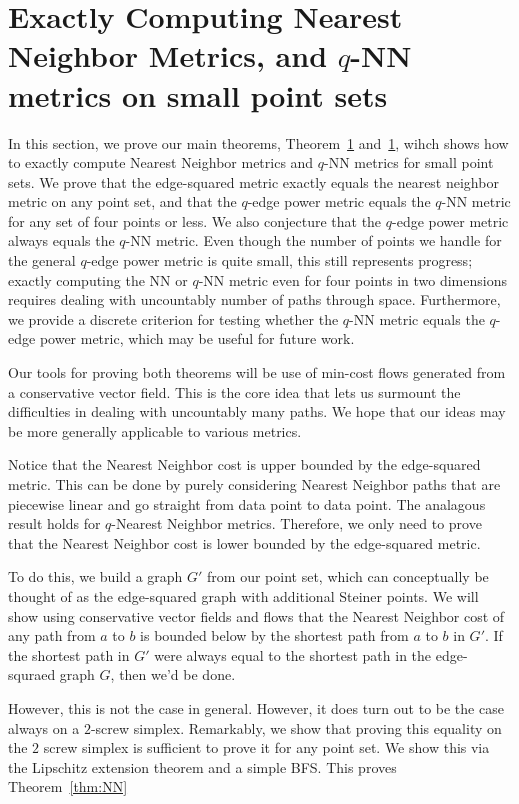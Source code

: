 \section{Exactly Computing Nearest Neighbor Metrics, and $q$-NN metrics on
small point sets}

In this section, we prove our main theorems, Theorem~\ref{} and~\ref{},
wihch shows how to exactly compute Nearest Neighbor metrics and $q$-NN
metrics for small point sets.
We prove that the edge-squared metric exactly equals the nearest neighbor
metric on any point set, and that the $q$-edge power metric equals the $q$-NN
metric for any set of four points or less. We also conjecture that the $q$-edge
power metric always equals the $q$-NN metric. Even though the number of points
we handle for the general $q$-edge power metric is quite small, this still
represents progress; exactly computing the NN or $q$-NN metric even for four
points in two dimensions requires dealing with uncountably number of paths
through space. Furthermore, we provide a discrete criterion for testing whether
the $q$-NN metric equals the $q$-edge power metric, which may be useful for
future work.

Our tools for proving both theorems will be use of min-cost flows generated
from a conservative vector field. This is the core idea that lets us surmount
the difficulties in dealing with uncountably many paths. We hope that our ideas
may be more generally applicable to various metrics.  

Notice that the Nearest Neighbor cost is upper bounded by the edge-squared
metric. This can be done by purely considering Nearest Neighbor paths that
are piecewise linear and go straight from data point to data point. The
analagous result holds for $q$-Nearest Neighbor metrics. Therefore, we only
need to prove that the Nearest Neighbor cost is lower bounded by the
edge-squared metric.

To do this, we build a graph $G'$ from our point set, which can
conceptually be thought of as the edge-squared graph with additional
Steiner points. We will show using conservative vector fields and flows
that the Nearest Neighbor cost of any path from $a$ to $b$ is bounded below
by the shortest path from $a$ to $b$ in $G'$. If the shortest path in $G'$
were always equal to the shortest path in the edge-squraed graph $G$, then
we'd be done.

However, this is not the case in general. However, it does turn out to be
the case always on a $2$-screw simplex. Remarkably, we show that proving
this equality on the $2$ screw simplex is sufficient to prove it for any
point set. We show this via the Lipschitz extension theorem and a simple
BFS. This proves Theorem~\ref{thm:NN}

